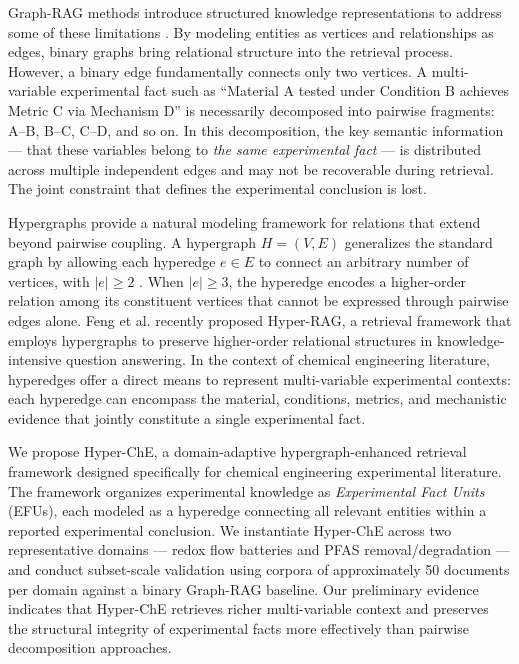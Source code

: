 Graph-RAG methods introduce structured knowledge representations to address some of these limitations \cite{edge2024local_to_global}. By modeling entities as vertices and relationships as edges, binary graphs bring relational structure into the retrieval process. However, a binary edge fundamentally connects only two vertices. A multi-variable experimental fact such as ``Material A tested under Condition B achieves Metric C via Mechanism D'' is necessarily decomposed into pairwise fragments: A--B, B--C, C--D, and so on. In this decomposition, the key semantic information --- that these variables belong to \emph{the same experimental fact} --- is distributed across multiple independent edges and may not be recoverable during retrieval. The joint constraint that defines the experimental conclusion is lost.

Hypergraphs provide a natural modeling framework for relations that extend beyond pairwise coupling. A hypergraph $H = (V, E)$ generalizes the standard graph by allowing each hyperedge $e \in E$ to connect an arbitrary number of vertices, with $|e| \geq 2$ \cite{bretto2013hypergraph}. When $|e| \geq 3$, the hyperedge encodes a higher-order relation among its constituent vertices that cannot be expressed through pairwise edges alone. Feng et al. \cite{feng2025hyperrag} recently proposed Hyper-RAG, a retrieval framework that employs hypergraphs to preserve higher-order relational structures in knowledge-intensive question answering. In the context of chemical engineering literature, hyperedges offer a direct means to represent multi-variable experimental contexts: each hyperedge can encompass the material, conditions, metrics, and mechanistic evidence that jointly constitute a single experimental fact.

We propose Hyper-ChE, a domain-adaptive hypergraph-enhanced retrieval framework designed specifically for chemical engineering experimental literature. The framework organizes experimental knowledge as \emph{Experimental Fact Units} (EFUs), each modeled as a hyperedge connecting all relevant entities within a reported experimental conclusion. We instantiate Hyper-ChE across two representative domains --- redox flow batteries and PFAS removal/degradation --- and conduct subset-scale validation using corpora of approximately 50 documents per domain against a binary Graph-RAG baseline. Our preliminary evidence indicates that Hyper-ChE retrieves richer multi-variable context and preserves the structural integrity of experimental facts more effectively than pairwise decomposition approaches.

